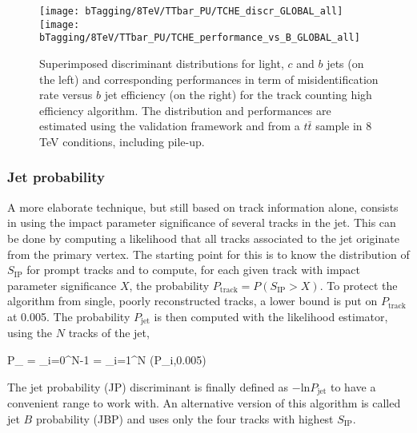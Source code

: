     \begin{figure}[th!]
        \centering
        \begin{minipage}{\textwidth}
        \texttt{[image: bTagging/8TeV/TTbar\_PU/TCHE\_discr\_GLOBAL\_all]}
        \texttt{[image: bTagging/8TeV/TTbar\_PU/TCHE\_performance\_vs\_B\_GLOBAL\_all]}
        \end{minipage}
        \caption{Superimposed discriminant distributions for light, $c$ and $b$
        jets (on the left) and corresponding performances in term of
        misidentification rate versus $b$ jet efficiency (on the right) for the
        track counting high efficiency algorithm.  The distribution and
        performances are estimated using the validation framework and from a
        $t\bar{t}$ sample in 8 TeV conditions, including pile-up.}
        \label{fig:bTagging/perfTC}
    \end{figure}

        \subsubsection{Jet probability}

    A more elaborate technique, but still based on track information alone,
    consists in using the impact parameter significance of several tracks in the
    jet. This can be done by computing a likelihood that all tracks associated
    to the jet originate from the primary vertex. The starting point for this is
    to know the distribution of $S_\text{IP}$ for prompt tracks and to compute,
    for each given track with impact parameter significance $X$, the probability
    $P_\text{track} = P(S_\text{IP} > X)$. To protect the algorithm from single,
    poorly reconstructed tracks, a lower bound is put on $P_\text{track}$ at
    0.005. The probability $P_\text{jet}$ is then computed with the likelihood
    estimator, using the $N$ tracks of the jet,

    {
        P_ = \Pi \cdot \sum_{i=0}^{N-1} 
         \Pi = \prod_{i=1}^{N}
        (P_{i},0.005)
    }

    The jet probability (JP) discriminant is finally defined as $- \text{ln}
    P_\text{jet}$ to have a convenient range to work with. An alternative
    version of this algorithm is called jet $B$ probability (JBP) and uses only
    the four tracks with highest $S_\text{IP}$.


